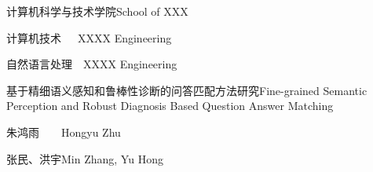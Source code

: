 
\school
{计算机科学与技术学院}{School of XXX}

\major
{计算机技术~~~}{XXXX Engineering}

\direct
{自然语言处理~~}{XXXX Engineering}

\thesistitle
{基于精细语义感知和鲁棒性诊断的问答匹配方法研究}{Fine-grained Semantic Perception and Robust Diagnosis Based Question Answer Matching}

\thesisauthor
{朱鸿雨~~~~}{Hongyu Zhu}

\teacher
{张民、洪宇}{Min Zhang, Yu Hong}





